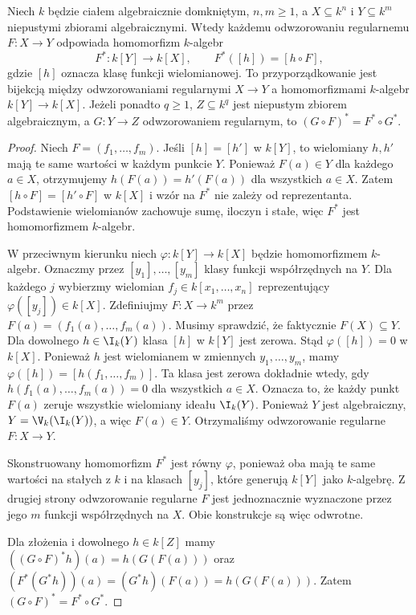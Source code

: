 \begin{twierdzenie}
\label{tw:affine-morphism}
Niech $k$ będzie ciałem algebraicznie domkniętym, $n,m\ge1$,
a $X\subseteq k^n$ i $Y\subseteq k^m$ niepustymi zbiorami
algebraicznymi. Wtedy każdemu odwzorowaniu regularnemu
$F:X\to Y$ odpowiada homomorfizm $k$-algebr
\[
F^*:k[Y]\longrightarrow k[X],\qquad
F^*([h])=[h\circ F],
\]
gdzie $[h]$ oznacza klasę funkcji wielomianowej.
To przyporządkowanie jest bijekcją między
odwzorowaniami regularnymi $X\to Y$ a homomorfizmami
$k$-algebr $k[Y]\to k[X]$.
Jeżeli ponadto $q\ge1$, $Z\subseteq k^q$ jest niepustym
zbiorem algebraicznym, a $G:Y\to Z$ odwzorowaniem regularnym,
to $(G\circ F)^*=F^*\circ G^*$.
\end{twierdzenie}
\begin{proof}
Niech $F=(f_1,\dots,f_m)$.
Jeśli $[h]=[h']$ w $k[Y]$, to wielomiany $h,h'$ mają
te same wartości w każdym punkcie $Y$. Ponieważ $F(a)\in Y$
dla każdego $a\in X$, otrzymujemy
$h(F(a))=h'(F(a))$ dla wszystkich $a\in X$.
Zatem $[h\circ F]=[h'\circ F]$ w $k[X]$ i wzór na $F^*$
nie zależy od reprezentanta.
Podstawienie wielomianów zachowuje sumę, iloczyn i stałe,
więc $F^*$ jest homomorfizmem $k$-algebr.

W przeciwnym kierunku niech
$\varphi:k[Y]\to k[X]$ będzie homomorfizmem $k$-algebr.
Oznaczmy przez $[y_1],\dots,[y_m]$ klasy funkcji współrzędnych
na $Y$. Dla każdego $j$ wybierzmy wielomian
$f_j\in k[x_1,\dots,x_n]$ reprezentujący
$\varphi([y_j])\in k[X]$.
Zdefiniujmy $F:X\to k^m$ przez
$F(a)=(f_1(a),\dots,f_m(a))$.
Musimy sprawdzić, że faktycznie $F(X)\subseteq Y$.
Dla dowolnego $h\in\I_k(Y)$ klasa $[h]$ w $k[Y]$ jest zerowa.
Stąd $\varphi([h])=0$ w $k[X]$.
Ponieważ $h$ jest wielomianem w zmiennych $y_1,\dots,y_m$,
mamy $\varphi([h])=[h(f_1,\dots,f_m)]$.
Ta klasa jest zerowa dokładnie wtedy, gdy
$h(f_1(a),\dots,f_m(a))=0$ dla wszystkich $a\in X$.
Oznacza to, że każdy punkt $F(a)$ zeruje wszystkie wielomiany
ideału $\I_k(Y)$. Ponieważ $Y$ jest algebraiczny,
$Y=\V_k(\I_k(Y))$, a więc $F(a)\in Y$.
Otrzymaliśmy odwzorowanie regularne $F:X\to Y$.

Skonstruowany homomorfizm $F^*$ jest równy $\varphi$,
ponieważ oba mają te same wartości na stałych z $k$
i na klasach $[y_j]$, które generują $k[Y]$ jako $k$-algebrę.
Z drugiej strony odwzorowanie regularne $F$ jest jednoznacznie
wyznaczone przez jego $m$ funkcji współrzędnych na $X$.
Obie konstrukcje są więc odwrotne.

Dla złożenia i dowolnego $h\in k[Z]$ mamy
$((G\circ F)^*h)(a)=h(G(F(a)))$
oraz $(F^*(G^*h))(a)=(G^*h)(F(a))=h(G(F(a)))$.
Zatem $(G\circ F)^*=F^*\circ G^*$.
\end{proof}

